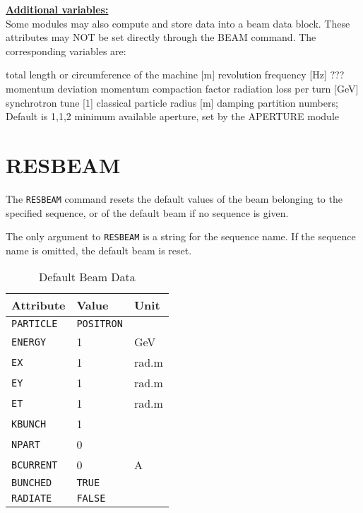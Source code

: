 {\bf \underline{Additional variables:}}\\ 
Some \mad modules may also compute and store data into a beam data 
block. These attributes may NOT be set directly through the BEAM
command. The corresponding variables are:  
\begin{madlist}
   total length or circumference of the machine [m]
   revolution frequency [Hz]
   ???
   momentum deviation
   momentum compaction factor
   radiation loss per turn [GeV]
   synchrotron tune [1]
   classical particle radius [m]
   damping partition numbers; Default is {1,1,2}
   minimum available aperture, set by the APERTURE module
\end{madlist}

\section{RESBEAM}
\label{sec:resbeam}

The {\tt RESBEAM} command resets the default values of the beam belonging to
the specified sequence, or of the default beam if no sequence is given.  


The only argument to {\tt RESBEAM} is a string for the sequence name.
If the sequence name is omitted, the default beam is reset. 

\begin{table}[h]
  \caption{Default Beam Data}
  \vspace{1ex}
  \begin{center}
     \begin{tabular}{|l|l|l|}
       \hline
       {\bf Attribute}   &  {\bf Value} & {\bf Unit}  \\
       \hline
       \texttt{PARTICLE} &  \texttt{POSITRON} & \\
       \texttt{ENERGY}   &  1           & GeV \\
       \texttt{EX}       &  1           & rad.m \\
       \texttt{EY}       &  1           & rad.m \\
       \texttt{ET}       &  1           & rad.m \\
       \texttt{KBUNCH}   &  1           & \\
       \texttt{NPART}    &  0           & \\
       \texttt{BCURRENT} &  0           & A \\
       \texttt{BUNCHED}  &  \texttt{TRUE}  & \\
       \texttt{RADIATE}  &  \texttt{FALSE} & \\     
       \hline
     \end{tabular}
  \end{center}
\end{table}


